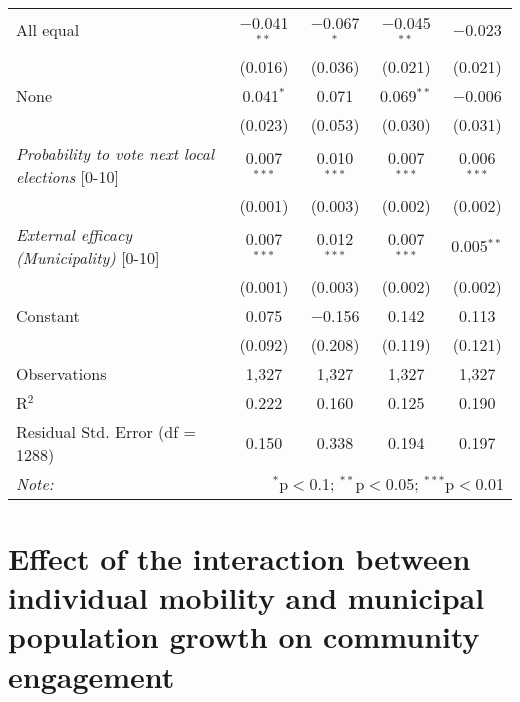 \documentclass[12pt,a4paper]{article}
\begin{document}
\begin{scriptsize}
\begin{longtable}{@{\extracolsep{5pt}}lcccc}
All equal & $-$0.041$^{**}$ & $-$0.067$^{*}$ & $-$0.045$^{**}$ & $-$0.023 \\ 
  & (0.016) & (0.036) & (0.021) & (0.021) \\ 
None & 0.041$^{*}$ & 0.071 & 0.069$^{**}$ & $-$0.006 \\ 
  & (0.023) & (0.053) & (0.030) & (0.031) \\ 
{\it Probability to vote next local elections} [0-10] & 0.007$^{***}$ & 0.010$^{***}$ & 0.007$^{***}$ & 0.006$^{***}$ \\ 
  & (0.001) & (0.003) & (0.002) & (0.002) \\ 
{\it External efficacy (Municipality)} [0-10] & 0.007$^{***}$ & 0.012$^{***}$ & 0.007$^{***}$ & 0.005$^{**}$ \\ 
  & (0.001) & (0.003) & (0.002) & (0.002) \\ 
  Constant & 0.075 & $-$0.156 & 0.142 & 0.113 \\ 
  & (0.092) & (0.208) & (0.119) & (0.121) \\ 
 \midrule
Observations & 1,327 & 1,327 & 1,327 & 1,327 \\ 
R$^{2}$ & 0.222 & 0.160 & 0.125 & 0.190 \\ 
Residual Std. Error (df = 1288) & 0.150 & 0.338 & 0.194 & 0.197 \\ 
\bottomrule
\textit{Note:}  & \multicolumn{4}{r}{$^{*}$p$<$0.1; $^{**}$p$<$0.05;
  $^{***}$p$<$0.01} \\  
\end{longtable} 
\end{scriptsize}

\newpage
\section{Effect of the interaction between individual mobility and
 municipal population growth on community engagement}\label{appB}
\end{document}
